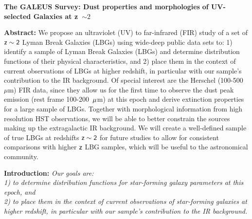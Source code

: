 \documentclass[12pt]{article}
\begin{document}
\newcommand{\Msun}{{\rm M}$_\odot$}
\newcommand{\Lya}{{\rm Ly}$\sf \alpha$}
\newcommand{\mum}{$\sf \mu$m}



\def\spose#1{\hbox to 0pt{#1\hss}}
\def\simlt{\mathrel{\spose{\lower 3pt\hbox{$\mathchar"218$}}
   \raise 2.0pt\hbox{$\mathchar"13C$}}}
\def\simgt{\mathrel{\spose{\lower 3pt\hbox{$\mathchar"218$}}
   \raise 2.0pt\hbox{$\mathchar"13E$}}}
\def\lsim{\rlap{$<$}{\lower 1.0ex\hbox{$\sim$}}}
\def\gsim{\rlap{$>$}{\lower 1.0ex\hbox{$\sim$}}}
\def\etal{et al.}
\def\kms{km~s$^{-1}$}
\def\refs{\leftskip=.3truein\parindent=-.3truein}
\def\unrefs{\leftskip=0.0truein\parindent=20pt}

\vspace*{-1cm}

\begin{spacing}{1.5}
{\bf \Large The GALEUS Survey: Dust properties and morphologies}
{\bf \Large of UV-selected Galaxies at z~{\boldmath $\sim 2$}}
\end{spacing}
\vspace{0.5cm}

{\bf Abstract: } We propose an ultraviolet (UV) to far-infrared (FIR) 
study of a set of $\sf z\sim 2$ Lyman
Break Galaxies (LBGs) using wide-deep public data sets to: 
1) identify a sample of Lyman Break Galaxies (LBGs) and determine
distribution functions of their physical characteristics, and
2) place them in the context of current observations of LBGs at higher
redshift, in particular with our sample's contribution to the IR background.
Of special interest are the Herschel (100-500 $\mu$m) FIR data, since
they allow us for the first time to observe the dust peak emission
(rest frame 100-200~\mum ) at this epoch and derive extinction
properties for a large sample of LBGs. Together with morphological
information from high resolution HST observations, we will be
able to better constrain the sources making up the extragalactic IR
background. We will create a well-defined sample of
true LBGs at redshifts $\sf z\sim 2$  for future studies to allow for consistent
comparisons with higher $\sf z$ LBG samples, which will be useful to the
astronomical community.
\vspace{0.2cm}

\hspace{0.1in}
{\bf Introduction: } 
{\it Our goals are:\\                                              
1) to determine distribution functions for star-forming galaxy parameters
at this epoch, and \\                            
2) to place them in the context of current observations of star-forming
galaxies at higher redshift, in particular with our sample's
contribution to the IR background.}
\end{document}
